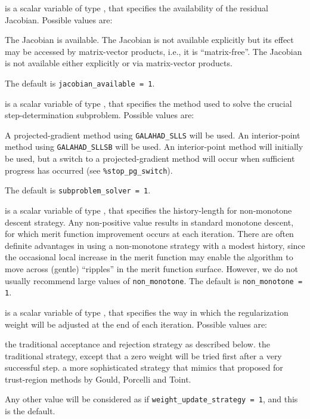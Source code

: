 \documentclass{galahad}
\begin{document}
\begin{description}
 is a scalar variable of type \integer,
that specifies the availability of the residual Jacobian.
Possible values are:

\begin{description}
 The Jacobian is available.
 The Jacobian is not available explicitly but its effect
may be accessed by matrix-vector products, i.e., it is ``matrix-free''.
 The Jacobian is not available either explicitly or via
matrix-vector products.
\end{description}
The default is {\tt jacobian\_available = 1}.

 is a scalar variable of type \integer, that
specifies the method used to solve the crucial step-determination
subproblem. Possible values are:
\begin{description}
 A projected-gradient method using {\tt GALAHAD\_SLLS} 
will be used.
 An interior-point method using {\tt GALAHAD\_SLLSB} will be used.
 An interior-point method will initially be used, but a
switch to a projected-gradient method will occur when sufficient progress
has occurred (see {\tt \%stop\_pg\_switch}).
\end{description}
The default is {\tt subproblem\_solver = 1}.

 is a scalar variable of type \integer, that
specifies the history-length for non-monotone descent strategy.
Any non-positive value results in standard monotone descent, for which
merit function improvement occurs at each iteration. There are often
definite advantages in using a non-monotone strategy with a modest history,
since the occasional local increase in the merit function may
enable the algorithm to move across (gentle) ``ripples'' in
the merit function surface.
However, we do not usually recommend large values of {\tt non\_monotone}.
The default is {\tt non\_monotone = 1}.

 is a scalar variable of type \integer,
that specifies the way in which the regularization weight will be adjusted
at the end of each iteration. Possible values are:
\begin{description}
 the traditional acceptance and rejection strategy as described below.
 the traditional strategy, except that a zero weight will be tried
first after a very successful step.
 a more sophisticated strategy that mimics that proposed
for trust-region methods by Gould, Porcelli and Toint.
\end{description}
Any other value will be considered as if {\tt weight\_update\_strategy = 1},
and this is the default.


\end{description}
\end{document}
